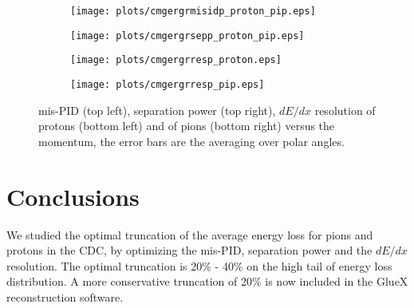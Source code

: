 \begin{figure}[H]
    \centering
    \begin{subfigure}[b]{0.45\textwidth}
        \texttt{[image: plots/cmgergrmisidp\_proton\_pip.eps]}
    \end{subfigure}\hfill
    \begin{subfigure}[b]{0.45\textwidth}
        \texttt{[image: plots/cmgergrsepp\_proton\_pip.eps]}
    \end{subfigure}\hfill
    \begin{subfigure}[b]{0.45\textwidth}
        \texttt{[image: plots/cmgergrresp\_proton.eps]}
    \end{subfigure}\hfill
    \begin{subfigure}[b]{0.45\textwidth}
        \texttt{[image: plots/cmgergrresp\_pip.eps]}
    \end{subfigure}
    \caption{mis-PID (top left), separation power (top right), $dE/dx$ resolution of protons (bottom left) and of pions (bottom right) versus the momentum, the error bars are the averaging over polar angles.}
    \label{fig.3.8}
\end{figure}

\section{Conclusions}
\label{p.3.4}

We studied the optimal truncation of the average energy loss for pions and protons in the CDC, by optimizing the mis-PID, separation power and the $dE/dx$ resolution. The optimal truncation is 20$\%$ - 40$\%$ on the high tail of energy loss distribution. A more conservative truncation of 20$\%$ is now included in the GlueX reconstruction software.

